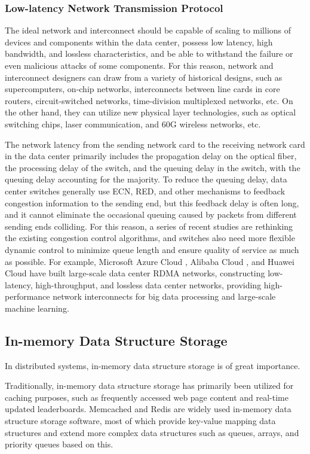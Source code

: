 \subsubsection{Low-latency Network Transmission Protocol}

The ideal network and interconnect should be capable of scaling to millions of devices and components within the data center, possess low latency, high bandwidth, and lossless characteristics, and be able to withstand the failure or even malicious attacks of some components. For this reason, network and interconnect designers can draw from a variety of historical designs, such as supercomputers, on-chip networks, interconnects between line cards in core routers, circuit-switched networks, time-division multiplexed networks, etc. On the other hand, they can utilize new physical layer technologies, such as optical switching chips, laser communication, and 60G wireless networks, etc.

The network latency from the sending network card to the receiving network card in the data center primarily includes the propagation delay on the optical fiber, the processing delay of the switch, and the queuing delay in the switch, with the queuing delay accounting for the majority. To reduce the queuing delay, data center switches generally use ECN, RED, and other mechanisms to feedback congestion information to the sending end, but this feedback delay is often long, and it cannot eliminate the occasional queuing caused by packets from different sending ends colliding. For this reason, a series of recent studies are rethinking the existing congestion control algorithms, and switches also need more flexible dynamic control to minimize queue length and ensure quality of service as much as possible. For example, Microsoft Azure Cloud \cite{guo2016rdma}, Alibaba Cloud \cite{aliyun-rdma}, and Huawei Cloud \cite{huawei-lossless} have built large-scale data center RDMA networks, constructing low-latency, high-throughput, and lossless data center networks, providing high-performance network interconnects for big data processing and large-scale machine learning.

\subsection{In-memory Data Structure Storage}

In distributed systems, in-memory data structure storage is of great importance.

Traditionally, in-memory data structure storage has primarily been utilized for caching purposes, such as frequently accessed web page content and real-time updated leaderboards. Memcached \cite{memcached} and Redis \cite{redis} are widely used in-memory data structure storage software, most of which provide key-value mapping data structures and extend more complex data structures such as queues, arrays, and priority queues based on this.

